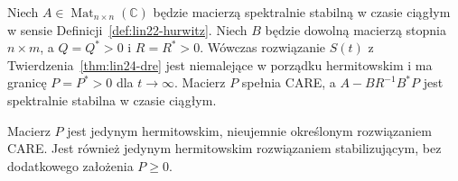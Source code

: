 \begin{twierdzenie}
\label{thm:lin24-care-existence}
Niech
\(A\in\operatorname{Mat}_{n\times n}(\mathbb C)\)
będzie macierzą spektralnie
stabilną w czasie ciągłym
w sensie
Definicji~\ref{def:lin22-hurwitz}.
Niech \(B\) będzie dowolną
macierzą stopnia \(n\times m\),
a \(Q=Q^*>0\) i \(R=R^*>0\).
Wówczas rozwiązanie \(S(t)\)
z Twierdzenia~\ref{thm:lin24-dre}
jest niemalejące
w porządku hermitowskim
i ma granicę
\(P=P^*>0\) dla \(t\to\infty\).
Macierz \(P\) spełnia CARE,
a \(A-BR^{-1}B^*P\)
jest spektralnie stabilna
w czasie ciągłym.

Macierz \(P\) jest
jedynym hermitowskim,
nieujemnie określonym
rozwiązaniem CARE.
Jest również jedynym
hermitowskim rozwiązaniem
stabilizującym,
bez dodatkowego
założenia \(P\ge0\).
\end{twierdzenie}
